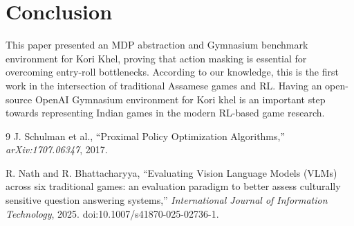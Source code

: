 \documentclass[10pt,twocolumn,a4paper]{article}
\begin{document}
\section{Conclusion}
This paper presented an MDP abstraction and Gymnasium benchmark environment for Kori Khel, proving that action masking is essential for overcoming entry-roll bottlenecks. According to our knowledge, this is the first work in the intersection of traditional Assamese games and RL. Having an open-source OpenAI Gymnasium environment for Kori khel is an important step towards representing Indian 
games in the modern RL-based game research. %

\begin{thebibliography}{9}
\small
\setlength{\itemsep}{0.5pt}
\setlength{\parskip}{0pt}
 J. Schulman et al., ``Proximal Policy Optimization Algorithms,'' \textit{arXiv:1707.06347}, 2017.

{}
R. Nath and R. Bhattacharyya,
``Evaluating Vision Language Models (VLMs) across six traditional games:
an evaluation paradigm to better assess culturally sensitive question answering systems,''
\textit{International Journal of Information Technology}, 2025.
doi:10.1007/s41870-025-02736-1.
\end{thebibliography}
\end{document}
